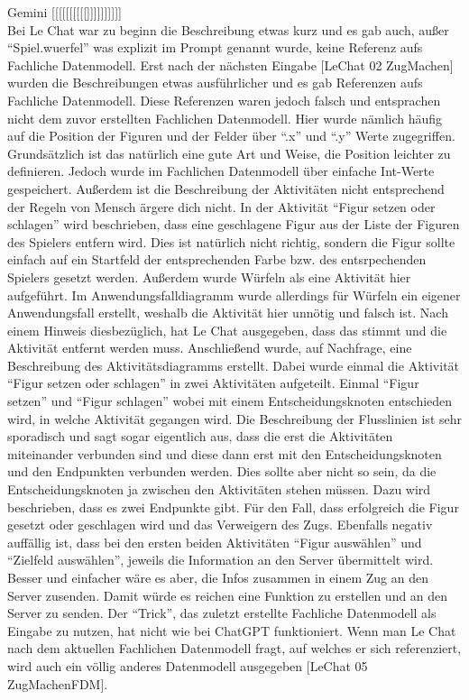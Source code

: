 Gemini [[[[[[[[[[]]]]]]]]]]\\

Bei Le Chat war zu beginn die Beschreibung etwas kurz und es gab auch, außer ``Spiel.wuerfel'' was explizit im Prompt genannt wurde, keine Referenz aufs Fachliche Datenmodell.
Erst nach der nächsten Eingabe [LeChat 02 ZugMachen] wurden die Beschreibungen etwas ausführlicher und es gab Referenzen aufs Fachliche Datenmodell. Diese Referenzen waren 
jedoch falsch und entsprachen nicht dem zuvor erstellten Fachlichen Datenmodell. Hier wurde nämlich häufig auf die Position der Figuren und der Felder über ``.x'' und ``.y''
Werte zugegriffen. Grundsätzlich ist das natürlich eine gute Art und Weise, die Position leichter zu definieren. Jedoch wurde im Fachlichen Datenmodell über einfache Int-Werte
gespeichert. Außerdem ist die Beschreibung der Aktivitäten nicht entsprechend der Regeln von Mensch ärgere dich nicht. In der Aktivität ``Figur setzen oder schlagen'' wird 
beschrieben, dass eine geschlagene Figur aus der Liste der Figuren des Spielers entfern wird. Dies ist natürlich nicht richtig, sondern die Figur sollte einfach auf ein Startfeld 
der entsprechenden Farbe bzw. des entsrpechenden Spielers gesetzt werden. Außerdem wurde Würfeln als eine Aktivität hier aufgeführt. Im Anwendungsfalldiagramm wurde allerdings
für Würfeln ein eigener Anwendungsfall erstellt, weshalb die Aktivität hier unnötig und falsch ist. Nach einem Hinweis diesbezüglich, hat Le Chat ausgegeben, dass das stimmt und
die Aktivität entfernt werden muss. Anschließend wurde, auf Nachfrage, eine Beschreibung des Aktivitätsdiagramms erstellt. Dabei wurde einmal die Aktivität ``Figur setzen oder 
schlagen'' in zwei Aktivitäten aufgeteilt. Einmal ``Figur setzen'' und ``Figur schlagen'' wobei mit einem Entscheidungsknoten entschieden wird, in welche Aktivität gegangen wird.
Die Beschreibung der Flusslinien ist sehr sporadisch und sagt sogar eigentlich aus, dass die erst die Aktivitäten miteinander verbunden sind und diese dann erst mit den 
Entscheidungsknoten und den Endpunkten verbunden werden. Dies sollte aber nicht so sein, da die Entscheidungsknoten ja zwischen den Aktivitäten stehen müssen. Dazu wird beschrieben, 
dass es zwei Endpunkte gibt. Für den Fall, dass erfolgreich die Figur gesetzt oder geschlagen wird und das Verweigern des Zugs. Ebenfalls negativ auffällig ist, dass bei den ersten
beiden Aktivitäten ``Figur auswählen'' und ``Zielfeld auswählen'', jeweils die Information an den Server übermittelt wird. Besser und einfacher wäre es aber, die Infos zusammen in einem
Zug an den Server zusenden. Damit würde es reichen eine Funktion zu erstellen und an den Server zu senden. Der ``Trick'', das zuletzt erstellte Fachliche Datenmodell als Eingabe 
zu nutzen, hat nicht wie bei ChatGPT funktioniert. Wenn man Le Chat nach dem aktuellen Fachlichen Datenmodell fragt, auf welches er sich referenziert, wird auch ein völlig anderes
Datenmodell ausgegeben [LeChat 05 ZugMachenFDM].


